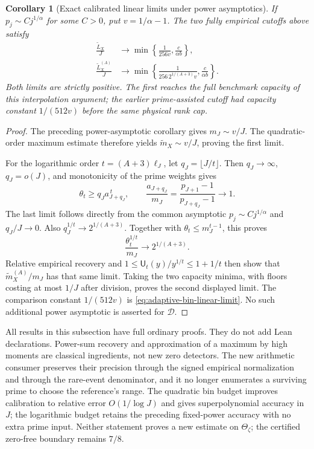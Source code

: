 \documentclass[11pt]{article}
\newtheorem{corollary}[theorem]{Corollary}
\theoremstyle{definition}
\begin{document}
\begin{corollary}[Exact calibrated linear limits under power asymptotics]
\label{cor:empirical-cutoff-linear-limits}
If $p_j\sim Cj^{1/\alpha}$ for some $C>0$, put
$v=1/\alpha-1$.
The two fully empirical cutoffs above satisfy
\begin{equation}
 \begin{aligned}
 \frac{\widetilde L_X}{J}
       &\longrightarrow
               \min\left\{\frac1{256v},\frac{c}{\alpha b}\right\},\\
 \frac{\widetilde L_X^{(A)}}J
       &\longrightarrow
          \min\left\{\frac1{256\,2^{1/(A+3)}v},
                                      \frac{c}{\alpha b}\right\}.
 \end{aligned}
 \label{eq:empirical-cutoff-linear-limits}
\end{equation}
Both limits are strictly positive.
The first reaches the full benchmark capacity of this
interpolation argument; the earlier prime-assisted cutoff had
capacity constant $1/(512v)$ before the same physical rank cap.
\end{corollary}

\begin{proof}
The preceding power-asymptotic corollary gives $m_J\sim v/J$.
The quadratic-order maximum estimate therefore yields
$\widetilde m_X\sim v/J$, proving the first limit.

For the logarithmic order $t=(A+3)\ell_J$, let
$q_J=\lfloor J/t\rfloor$.
Then $q_J\to\infty$, $q_J=o(J)$, and monotonicity of
the prime weights gives
\[
 \theta_t\ge q_Ja_{J+q_J}^{\,t},\qquad
 \frac{a_{J+q_J}}{m_J}
       =\frac{p_{J+1}-1}{p_{J+q_J}-1}\longrightarrow1 .
\]
The last limit follows directly from the common asymptotic
$p_j\sim Cj^{1/\alpha}$ and $q_J/J\to0$.
Also $q_J^{1/t}\to2^{1/(A+3)}$.
Together with $\theta_t\le m_J^{t-1}$, this proves
\[
 \frac{\theta_t^{1/t}}{m_J}\longrightarrow2^{1/(A+3)} .
\]
Relative empirical recovery and
$1\le\mathsf U_t(y)/y^{1/t}\le1+1/t$ then show that
$\widetilde m_X^{(A)}/m_J$ has that same limit.
Taking the two capacity minima, with floors costing at most
$1/J$ after division, proves the second displayed limit.
The comparison constant $1/(512v)$ is
\eqref{eq:adaptive-bin-linear-limit}.
No such additional power asymptotic is asserted for
$\mathcal D$.
\end{proof}

All results in this subsection have full ordinary proofs.
They do not add Lean declarations.
Power-sum recovery and approximation of a maximum by high
moments are classical ingredients, not new zero detectors.
The new arithmetic consumer preserves their precision through
the signed empirical normalization and through the rare-event
denominator, and it no longer enumerates a surviving prime
to choose the reference's range.
The quadratic bin budget improves calibration to relative
error $O(1/\log J)$ and gives superpolynomial accuracy in $J$;
the logarithmic budget retains the preceding fixed-power
accuracy with no extra prime input.
Neither statement proves a new estimate on
$\Theta_\zeta$; the certified zero-free boundary remains $7/8$.
\end{document}

